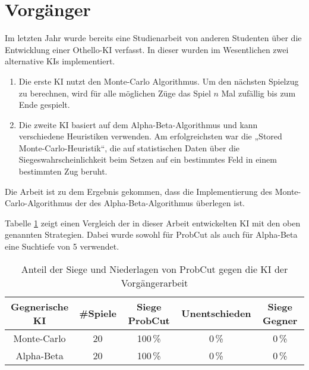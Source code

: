 
\section{Vorgänger}
Im letzten Jahr wurde bereits eine Studienarbeit von anderen Studenten über die Entwicklung einer Othello-KI verfasst.
In dieser wurden im Wesentlichen zwei alternative KIs implementiert.
\begin{enumerate}
    \item Die erste KI nutzt den Monte-Carlo Algorithmus. Um den nächsten Spielzug zu berechnen, wird für alle möglichen
    Züge das Spiel $n$ Mal zufällig bis zum Ende gespielt.
    \cite[S.~19]{othellustudienarbeit}
    \item Die zweite KI basiert auf dem Alpha-Beta-Algorithmus und kann verschiedene Heuristiken verwenden. Am
    erfolgreichsten war die „Stored Monte-Carlo-Heuristik“, die auf statistischen Daten über die
    Siegeswahrscheinlichkeit beim Setzen auf ein bestimmtes Feld in einem bestimmten Zug beruht.
    \cite[S.~30]{othellustudienarbeit}
\end{enumerate}
Die Arbeit ist zu dem Ergebnis gekommen, dass die Implementierung des Monte-Carlo-Algorithmus der des
Alpha-Beta-Algorithmus überlegen ist.
\cite[S.~55]{othellustudienarbeit}

Tabelle \ref{table:comp:previous} zeigt einen Vergleich der in dieser Arbeit entwickelten KI mit den oben genannten Strategien. Dabei wurde sowohl für ProbCut als auch für Alpha-Beta eine Suchtiefe von 5 verwendet.

\begin{table}[hb]
\centering
\begin{tabular}{c|c|ccc}
\hline
Gegnerische KI & \#Spiele & Siege ProbCut & Unentschieden & Siege Gegner \\
\hline
 Monte-Carlo & 20 & 100\,\% &   0\,\% &  0\,\% \\
 Alpha-Beta   & 20 & 100\,\% &   0\,\% &  0\,\% \\
\hline
\end{tabular}
\caption{Anteil der Siege und Niederlagen von ProbCut gegen die KI der Vorgängerarbeit}
\label{table:comp:previous}
\end{table}
